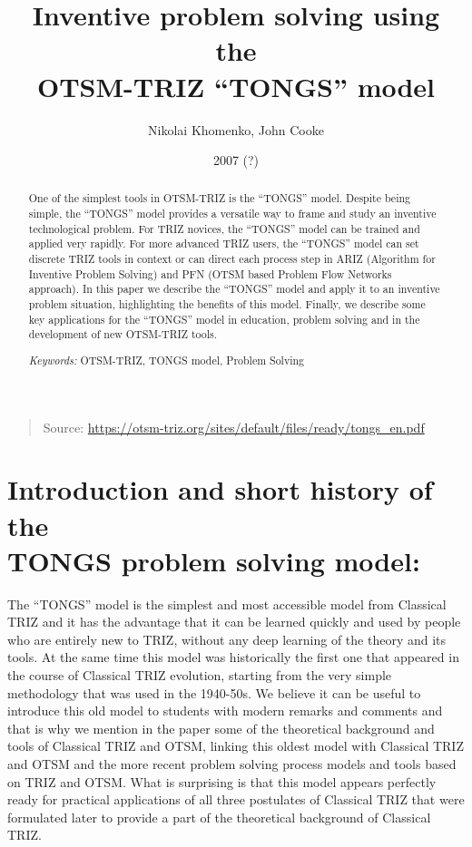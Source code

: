 \documentclass[11pt,a4paper]{article}
\title{Inventive problem solving using the\\ OTSM-TRIZ “TONGS” model}
\author{Nikolai Khomenko, John Cooke}
\date{2007 (?)}
\begin{document}
\maketitle
\begin{quote}
  Source: \url{https://otsm-triz.org/sites/default/files/ready/tongs_en.pdf}
\end{quote}

\begin{abstract}
One of the simplest tools in OTSM-TRIZ is the “TONGS” model. Despite being
simple, the “TONGS” model provides a versatile way to frame and study an
inventive technological problem.  For TRIZ novices, the “TONGS” model can be
trained and applied very rapidly.  For more advanced TRIZ users, the “TONGS”
model can set discrete TRIZ tools in context or can direct each process step
in ARIZ (Algorithm for Inventive Problem Solving) and PFN (OTSM based Problem
Flow Networks approach). In this paper we describe the “TONGS” model and apply
it to an inventive problem situation, highlighting the benefits of this
model. Finally, we describe some key applications for the “TONGS” model in
education, problem solving and in the development of new OTSM-TRIZ tools.

\emph{Keywords:} OTSM-TRIZ, TONGS model, Problem Solving
\end{abstract}

\section{Introduction and short history of the\\ TONGS problem solving model:}  

The “TONGS” model is the simplest and most accessible model from Classical
TRIZ and it has the advantage that it can be learned quickly and used by
people who are entirely new to TRIZ, without any deep learning of the theory
and its tools.  At the same time this model was historically the first one
that appeared in the course of Classical TRIZ evolution, starting from the
very simple methodology that was used in the 1940-50s. We believe it can be
useful to introduce this old model to students with modern remarks and
comments and that is why we mention in the paper some of the theoretical
background and tools of Classical TRIZ and OTSM, linking this oldest model
with Classical TRIZ and OTSM and the more recent problem solving process
models and tools based on TRIZ and OTSM. What is surprising is that this model
appears perfectly ready for practical applications of all three postulates of
Classical TRIZ that were formulated later to provide a part of the theoretical
background of Classical TRIZ.
\end{document}
